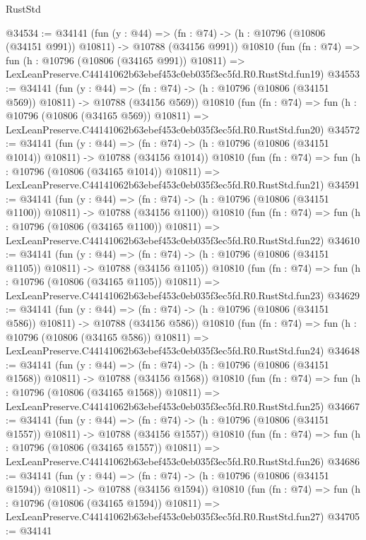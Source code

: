 \begin{lexlean}{RustStd}
\begin{coremodule}
@34534 := @34141
    (fun (y : @44) =>
    (fn : @74) -> (h : @10796 (@10806 (@34151 @991)) @10811) -> @10788 (@34156 @991))
    @10810
    (fun (fn : @74) =>
    fun (h : @10796 (@10806 (@34165 @991)) @10811) =>
    LexLeanPreserve.C44141062b63ebef453c0eb035f3ec5fd.R0.RustStd.fun19)
@34553 := @34141
    (fun (y : @44) =>
    (fn : @74) -> (h : @10796 (@10806 (@34151 @569)) @10811) -> @10788 (@34156 @569))
    @10810
    (fun (fn : @74) =>
    fun (h : @10796 (@10806 (@34165 @569)) @10811) =>
    LexLeanPreserve.C44141062b63ebef453c0eb035f3ec5fd.R0.RustStd.fun20)
@34572 := @34141
    (fun (y : @44) =>
    (fn : @74) -> (h : @10796 (@10806 (@34151 @1014)) @10811) -> @10788 (@34156 @1014))
    @10810
    (fun (fn : @74) =>
    fun (h : @10796 (@10806 (@34165 @1014)) @10811) =>
    LexLeanPreserve.C44141062b63ebef453c0eb035f3ec5fd.R0.RustStd.fun21)
@34591 := @34141
    (fun (y : @44) =>
    (fn : @74) -> (h : @10796 (@10806 (@34151 @1100)) @10811) -> @10788 (@34156 @1100))
    @10810
    (fun (fn : @74) =>
    fun (h : @10796 (@10806 (@34165 @1100)) @10811) =>
    LexLeanPreserve.C44141062b63ebef453c0eb035f3ec5fd.R0.RustStd.fun22)
@34610 := @34141
    (fun (y : @44) =>
    (fn : @74) -> (h : @10796 (@10806 (@34151 @1105)) @10811) -> @10788 (@34156 @1105))
    @10810
    (fun (fn : @74) =>
    fun (h : @10796 (@10806 (@34165 @1105)) @10811) =>
    LexLeanPreserve.C44141062b63ebef453c0eb035f3ec5fd.R0.RustStd.fun23)
@34629 := @34141
    (fun (y : @44) =>
    (fn : @74) -> (h : @10796 (@10806 (@34151 @586)) @10811) -> @10788 (@34156 @586))
    @10810
    (fun (fn : @74) =>
    fun (h : @10796 (@10806 (@34165 @586)) @10811) =>
    LexLeanPreserve.C44141062b63ebef453c0eb035f3ec5fd.R0.RustStd.fun24)
@34648 := @34141
    (fun (y : @44) =>
    (fn : @74) -> (h : @10796 (@10806 (@34151 @1568)) @10811) -> @10788 (@34156 @1568))
    @10810
    (fun (fn : @74) =>
    fun (h : @10796 (@10806 (@34165 @1568)) @10811) =>
    LexLeanPreserve.C44141062b63ebef453c0eb035f3ec5fd.R0.RustStd.fun25)
@34667 := @34141
    (fun (y : @44) =>
    (fn : @74) -> (h : @10796 (@10806 (@34151 @1557)) @10811) -> @10788 (@34156 @1557))
    @10810
    (fun (fn : @74) =>
    fun (h : @10796 (@10806 (@34165 @1557)) @10811) =>
    LexLeanPreserve.C44141062b63ebef453c0eb035f3ec5fd.R0.RustStd.fun26)
@34686 := @34141
    (fun (y : @44) =>
    (fn : @74) -> (h : @10796 (@10806 (@34151 @1594)) @10811) -> @10788 (@34156 @1594))
    @10810
    (fun (fn : @74) =>
    fun (h : @10796 (@10806 (@34165 @1594)) @10811) =>
    LexLeanPreserve.C44141062b63ebef453c0eb035f3ec5fd.R0.RustStd.fun27)
@34705 := @34141

\end{coremodule}
\end{lexlean}
